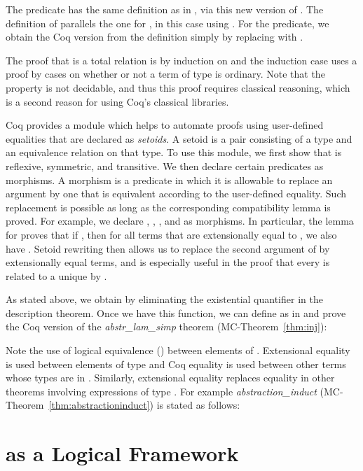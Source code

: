 \documentclass[final]{svjour3}
\begin{document}
The predicate  has the same definition as in \HOL, via this
new version of .  The definition of  parallels
the one for , in this case using .  For
the  predicate, we obtain the Coq version from the \HOL
definition simply by replacing  with .

The proof that  is a total relation is by induction on
 and
the induction case uses a proof by cases on whether or not a term of
type  is ordinary.  Note that the 
property is not decidable, and thus this proof requires classical
reasoning, which is a second reason for using Coq's classical
libraries.

Coq provides a module which helps to automate proofs using
user-defined equalities that are declared as \emph{setoids}.  A setoid
is a pair consisting of a type and an equivalence relation on that
type.  To use this module, we first show that  is reflexive,
symmetric, and transitive.  We then declare certain predicates as
morphisms.  A morphism is a predicate in which it is allowable to
replace an argument by one that is equivalent according to the user-defined
equality.  Such replacement is possible as long as the corresponding
compatibility lemma is proved.  For example, we declare
, , , and  as
morphisms.  In particular, the lemma for  proves that if
, then for all terms  that are extensionally
equal to , we also have .  Setoid rewriting then
allows us to replace the second argument of  by
extensionally equal terms, and is especially useful in the proof that
every  is related to a unique  by .

As stated above, we obtain  by eliminating the existential
quantifier in the description theorem.  Once we have this function, we
can define  as in \HOL and prove the Coq version of the
\textit{abstr\_lam\_simp} theorem
\mbox{(MC-Theorem~\ref{thm:inj})}:  
 
Note the use of logical equivalence () between
elements of \Prop.  Extensional equality is used between elements of
type  and Coq equality is used between other terms
whose types are in \Set.  Similarly, extensional equality replaces
equality in other theorems involving expressions of type .  For example \textit{abstraction\_induct}
(MC-Theorem~\ref{thm:abstractioninduct}) is stated as follows:
 



\section{\hybrid as a Logical Framework}
\label{using}
\end{document}
